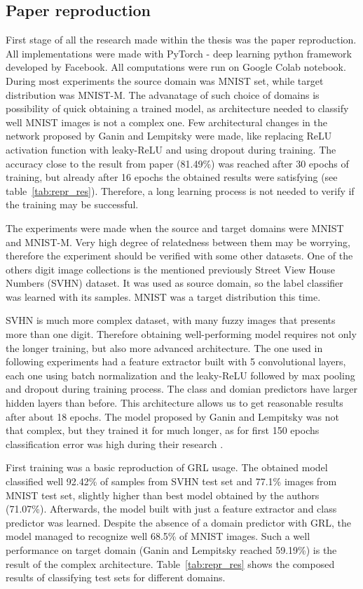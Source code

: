 \documentclass{article}
\begin{document}
\subsection{Paper reproduction}
First stage of all the research made within the thesis was the paper reproduction. All implementations were made with PyTorch \cite{pytorch} - deep learning python framework developed by Facebook. All computations were run on Google Colab \cite{colab} notebook. During most experiments the source domain was MNIST set, while target distribution was MNIST-M. The advanatage of such choice of domains is possibility of quick obtaining a trained model, as architecture needed to classify well MNIST images is not a complex one. Few architectural changes in the network proposed by Ganin and Lempitsky were made, like replacing ReLU activation function with leaky-ReLU \cite{leaky_relu} and using dropout \cite{dropout} during training. The accuracy close to the result from paper (81.49\%) was reached after 30 epochs of training, but already after 16 epochs the obtained results were satisfying (see table~\ref{tab:repr_res}). Therefore, a long learning process is not needed to verify if the training may be successful.
\par
The experiments were made when the source and target domains were MNIST and MNIST-M. Very high degree of relatedness between them may  be worrying, therefore the experiment should be verified with some other datasets. One of the others digit image collections is the mentioned previously Street View House Numbers (SVHN) dataset. It was used as source domain, so the label classifier was learned with its samples. MNIST was a target distribution this time.
\par
SVHN is much more complex dataset, with many fuzzy images that presents more than one digit. Therefore obtaining well-performing model requires not only the longer training, but also more advanced architecture. The one used in following experiments had a feature extractor built with 5 convolutional layers, each one using batch normalization \cite{batch_norm} and the leaky-ReLU followed by max pooling and dropout during training process. The class and domian predictors have larger hidden layers than before. This architecture allows us to get reasonable results after about 18 epochs. The model proposed by Ganin and Lempitsky was not that complex, but they trained it for much longer, as for first 150 epochs classification error was high during their research \cite{pmlr-v37-ganin15}.
\par
First training was a basic reproduction of GRL usage. The obtained model classified well 92.42\% of samples from SVHN test set and 77.1\% images from MNIST test set, slightly higher than best model obtained by the authors (71.07\%). Afterwards, the model built with just a feature extractor and class predictor was learned. Despite the absence of a domain predictor with GRL, the model managed to recognize well 68.5\% of MNIST images. Such a well performance on target domain (Ganin and Lempitsky reached 59.19\%) is the result of the complex architecture. Table~\ref{tab:repr_res} shows the composed results of classifying test sets for different domains.
\end{document}
